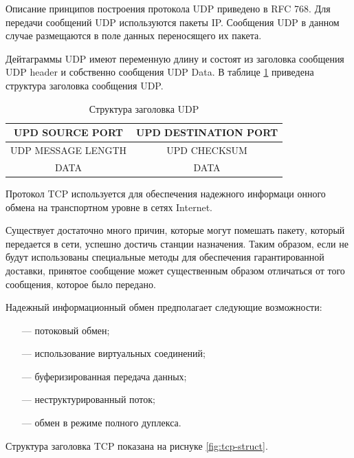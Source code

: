 Описание принципов построения протокола UDP приведено в RFC 768. Для передачи сообщений UDP используются пакеты IP. Сообщения UDP в данном случае размещаются в поле данных переносящего их пакета.

Дейтаграммы UDP имеют переменную длину и состоят из заголов­ка сообщения UDP header и собственно сообщения UDP Data. В таблице \ref{tab:udp-header} приведена структура заголовка сообщения UDP.

\begin{table}[h]
	\begin{center}
		\begin{tabular}{ |c|c| }
			\hline 
			UPD  SOURCE PORT & UPD DESTINATION PORT \\ \hline
			UDP MESSAGE LENGTH & UPD CHECKSUM \\  \hline
			DATA  & DATA \\  \hline
		\end{tabular}
		\caption{\label{tab:udp-header}Структура заголовка UDP}
	\end{center}
\end{table}

Протокол TCP используется для обеспечения надежного информаци­
онного обмена на транспортном уровне в сетях Internet.

Существует достаточно много причин, которые могут помешать пакету, который передается в сети, успешно достичь станции назначения. Таким образом, если не будут использованы специальные методы для обеспечения гарантированной доставки, принятое сообщение может существенным образом отличаться от того сообщения, которое было передано.

Надежный информационный обмен предполагает следующие возмож­ности:
\begin{itemize}
	\item[---] потоковый обмен;
	\item[---] использование виртуальных соединений;
	\item[---] буферизированная передача данных;
	\item[---] неструктурированный поток;
	\item[---] обмен в режиме полного дуплекса.
\end{itemize}

Структура заголовка TCP показана на риснуке \ref{fig:tcp-struct}.

